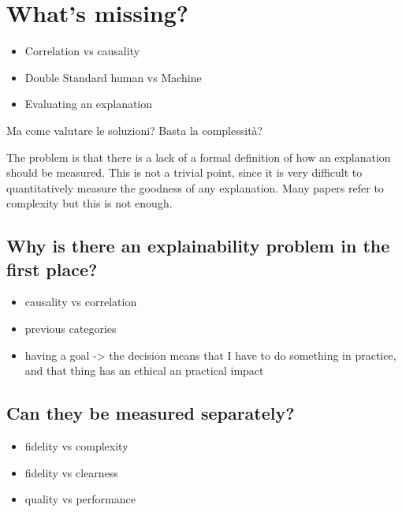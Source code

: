 \documentclass[conference]{IEEEtran}
\begin{document}




\section{What's missing?}
\label{sec:missing}



\begin{itemize}
    \item Correlation vs causality
    \item Double Standard human vs Machine
    \item Evaluating an explanation
\end{itemize}

Ma come valutare le soluzioni? Basta la complessità?

The problem is that there is a lack of a formal definition of how an explanation
should be measured. This is not a trivial point, since it is very difficult to
quantitatively measure the goodness of any explanation. Many papers refer to
complexity but this is not enough.

\subsection{Why is there an explainability problem in the first place?}

\begin{itemize}
    \item causality vs correlation
    \item previous categories
    \item having a goal -> the decision means that I have to do something in
          practice, and that thing has an ethical an practical impact
\end{itemize}


\subsection{Can they be measured separately?}

\begin{itemize}
    \item fidelity vs complexity
    \item fidelity vs clearness
    \item quality vs performance
\end{itemize}
\end{document}

